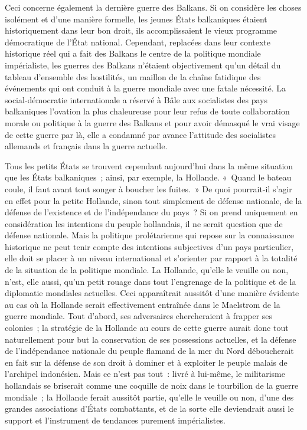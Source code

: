 \documentclass[french,twoside]{book} %
\begin{document}
Ceci concerne également la dernière guerre des Balkans. Si on considère les choses isolément et d’une manière formelle, les jeunes États balkaniques étaient historiquement dans leur bon droit, ils accomplissaient le vieux programme démocratique de l’État national. Cependant, replacées dans leur contexte historique réel qui a fait des Balkans le centre de la politique mondiale impérialiste, les guerres des Balkans n’étaient objectivement qu’un détail du tableau d’ensemble des hostilités, un maillon de la chaîne fatidique des événements qui ont conduit à la guerre mondiale avec une fatale nécessité. La social-démocratie internationale a réservé à Bâle aux socialistes des pays balkaniques l’ovation la plus chaleureuse pour leur refus de toute collaboration morale ou politique à la guerre des Balkans et pour avoir démasqué le vrai visage de cette guerre par là, elle a condamné par avance l’attitude des socialistes allemands et français dans la guerre actuelle.\par
Tous les petits États se trouvent cependant aujourd’hui dans la même situation que les États balkaniques ; ainsi, par exemple, la Hollande. « Quand le bateau coule, il faut avant tout songer à boucher les fuites. » De quoi pourrait-il s’agir en effet pour la petite Hollande, sinon tout simplement de défense nationale, de la défense de l’existence et de l’indépendance du pays ? Si on prend uniquement en  considération les intentions du peuple hollandais, il ne serait question que de défense nationale. Mais la politique prolétarienne qui repose sur la connaissance historique ne peut tenir compte des intentions subjectives d’un pays particulier, elle doit se placer à un niveau international et s’orienter par rapport à la totalité de la situation de la politique mondiale. La Hollande, qu’elle le veuille ou non, n’est, elle aussi, qu’un petit rouage dans tout l’engrenage de la politique et de la diplomatie mondiales actuelles. Ceci apparaîtrait aussitôt d’une manière évidente au cas où la Hollande serait effectivement entraînée dans le Maelstrom de la guerre mondiale. Tout d’abord, ses adversaires chercheraient à frapper ses colonies ; la stratégie de la Hollande au cours de cette guerre aurait donc tout naturellement pour but la conservation de ses possessions actuelles, et la défense de l’indépendance nationale du peuple flamand de la mer du Nord déboucherait en fait sur la défense de son droit à dominer et à exploiter le peuple malais de l’archipel indonésien. Mais ce n’est pas tout : livré à lui-même, le militarisme hollandais se briserait comme une coquille de noix dans le tourbillon de la guerre mondiale ; la Hollande ferait aussitôt partie, qu’elle le veuille ou non, d’une des grandes associations d’États combattants, et de la sorte elle deviendrait aussi le support et l’instrument de tendances purement impérialistes.\par
\end{document}
